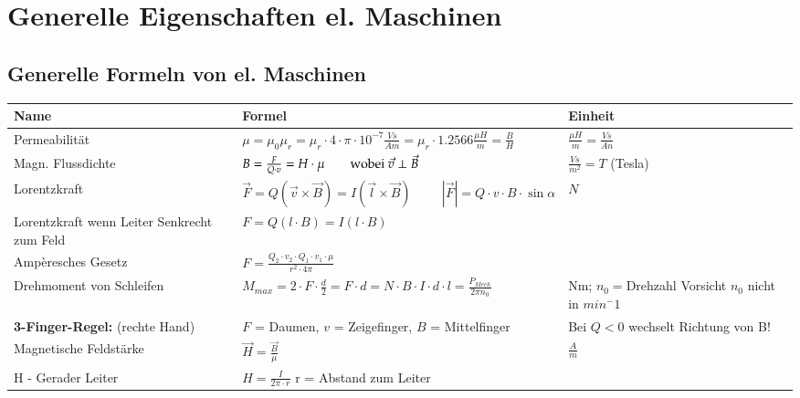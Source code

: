 \section{Generelle Eigenschaften el. Maschinen}
    \subsection{Generelle Formeln von el. Maschinen}
        \renewcommand{\arraystretch}{1.4}
        \begin{tabular}[c]{ | p{5cm} | p{8cm} | p{4cm} | }
            \hline
            \textbf{Name} &
            \textbf{Formel} &
            \textbf{Einheit} \\
            \hline
            Permeabilität &
            $\mu = \mu_0 \mu_r = \mu_r \cdot 4 \cdot \pi \cdot 10^{-7} \frac{Vs}{Am} = \mu_r \cdot 1.2566 \frac{\mu H}{m}=\frac{B}{H}$ &
            $\frac{\mu H}{m}=\frac{Vs}{An}$ \\
            \hline
            Magn. Flussdichte &
            $B = \frac{F}{Q \cdot v} = H \cdot \mu \text{\qquad wobei } \vec{v} \perp \vec{B}$ &
            $\frac{Vs}{m^2} = T$ (Tesla) \\
            \hline
            Lorentzkraft &
            $\vec{F} = Q (\vec{v} \times \vec{B})=I(\vec{l}\times \vec{B}) \hspace{1cm} |\vec{F}| = Q \cdot v \cdot B \cdot \sin\alpha$ &
            $N$ \\
            Lorentzkraft wenn Leiter Senkrecht zum Feld & $ F = Q(l \cdot B) = I(l \cdot B) $& \\
            Ampèresches Gesetz &
            $F=\frac{Q_2 \cdot v_2 \cdot Q_1 \cdot v_1 \cdot \mu}{r^2 \cdot 4\pi}$ &
            \\
            \hline
            Drehmoment von Schleifen &
            $M_{max} = 2 \cdot F \cdot \frac{d}{2}= F \cdot d = N \cdot B \cdot I \cdot d \cdot l = \frac{P_{Mech}}{2 \pi n_0} $ &
            Nm; $n_0= $Drehzahl Vorsicht $n_0$ nicht in $min^-1$ \\
            \hline
            \textbf{3-Finger-Regel:} (rechte Hand) &
            $F$ = Daumen, $v$ = Zeigefinger, $B$ = Mittelfinger &
            Bei $Q < 0$ wechselt Richtung von B! \\
            \hline
            Magnetische Feldstärke & 
            $\vec{H} = \frac{ \vec{B}}{\mu }$   &
            $\frac{A}{m}$ \\
            H - Gerader Leiter & $ H = \frac{I}{2 \pi \cdot r}$ \qquad r = Abstand zum Leiter& \\ 

\end{tabular}
